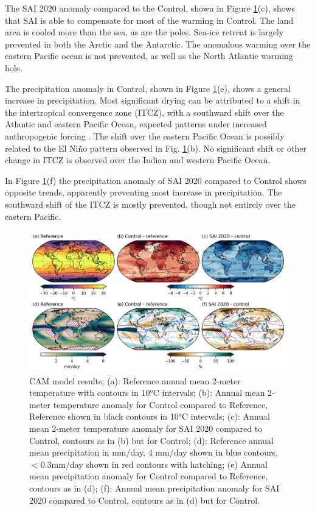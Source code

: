 The SAI 2020 anomaly compared to the Control, shown in Figure \ref{fig:CAM_scens}(c), shows that SAI is able to compensate for most of the warming in Control. The land area is cooled more than the sea, as are the poles. Sea-ice retreat is largely prevented in both the Arctic and the Antarctic. The anomalous warming over the eastern Pacific ocean is not prevented, as well as the North Atlantic warming hole. 

The precipitation anomaly in Control, shown in Figure \ref{fig:CAM_scens}(e), shows a general increase in precipitation. Most significant drying can be attributed to a shift in the intertropical convergence zone (ITCZ), with a southward shift over the Atlantic and eastern Pacific Ocean, expected patterns under increased anthropogenic forcing \parencite{mamalakis2021zonally}. The shift over the eastern Pacific Ocean is possibly related to the El Ni\~no pattern observed in Fig. \ref{fig:CAM_scens}(b). No significant shift or other change in ITCZ is observed over the Indian and western Pacific Ocean.

In Figure \ref{fig:CAM_scens}(f) the precipitation anomaly of SAI 2020 compared to Control shows opposite trends, apparently preventing most increase in precipitation. The southward shift of the ITCZ is mostly prevented, though not entirely over the eastern Pacific.

\begin{figure}[H]
	\centering
	\includegraphics[width=0.95\linewidth]{images/CAM_scens.png}
	\caption{CAM model results; (a): Reference annual mean 2-meter temperature with contours in 10°C intervals; (b): Annual mean 2-meter temperature anomaly for Control compared to Reference, Reference shown in black contours in 10°C intervals; (c): Annual mean 2-meter temperature anomaly for SAI 2020 compared to Control, contours as in (b) but for Control; (d): Reference annual mean precipitation in mm/day, 4 mm/day shown in blue contours, $<0.3$mm/day shown in red contours with hatching; (e) Annual mean precipitation anomaly for Control compared to Reference, contours as in (d); (f): Annual mean precipitation anomaly for SAI 2020 compared to Control, contours as in (d) but for Control.}
	\label{fig:CAM_scens}
\end{figure}


